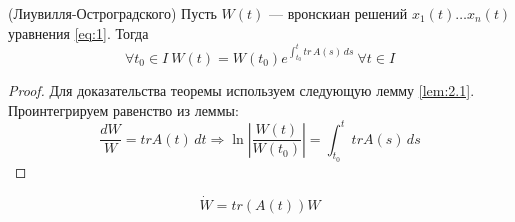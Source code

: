 \documentclass[11pt]{article}
\begin{document}
\begin{theorem}
    (Лиувилля-Остроградского) Пусть $W(t)$ --- вронскиан решений $x_1(t)\ldots x_n(t)$ уравнения \eqref{eq:1}.
    Тогда  \[ \forall t_0\in I \ W(t) = W(t_0) e^{\int_{t_0}^{t} tr\,A(s)\, ds} \ \forall t\in I \] 
\end{theorem}

\begin{proof}
    Для доказательства теоремы используем следующую лемму \ref{lem:2.1}. 
    Проинтегрируем равенство из леммы:
    \[ \frac{dW}{W} = trA(t)\, dt \Rightarrow \ln \left| \frac{W(t)}{W(t_0)} \right| = \int_{t_0}^{t} trA(s)\, ds \]
\end{proof}

\begin{lemma}\label{lem:2.1}
    \[ \dot{W} = tr(A(t))W \]   
\end{lemma}
\end{document}
